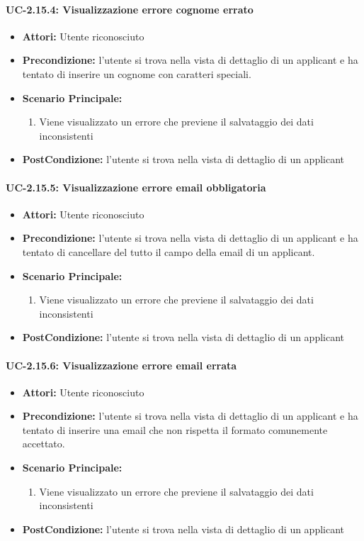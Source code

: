\paragraph{UC-2.15.4: Visualizzazione errore cognome errato}
\begin{itemize}	
	\item \textbf{Attori:} Utente riconosciuto
	\item \textbf{Precondizione:}  l'utente si trova nella vista di dettaglio di un applicant e ha tentato di inserire un cognome con caratteri speciali.
	\item \textbf{Scenario Principale:}
	\begin{enumerate}
		\item Viene visualizzato un errore che previene il salvataggio dei dati inconsistenti
	\end{enumerate}
	\item \textbf{PostCondizione:} l'utente si trova nella vista di dettaglio di un applicant
\end{itemize}

\paragraph{UC-2.15.5: Visualizzazione errore email obbligatoria}
\begin{itemize}	
	\item \textbf{Attori:} Utente riconosciuto
	\item \textbf{Precondizione:}  l'utente si trova nella vista di dettaglio di un applicant e ha tentato di cancellare del tutto il campo della email di un applicant.
	\item \textbf{Scenario Principale:}
	\begin{enumerate}
		\item Viene visualizzato un errore che previene il salvataggio dei dati inconsistenti
	\end{enumerate}
	\item \textbf{PostCondizione:} l'utente si trova nella vista di dettaglio di un applicant
\end{itemize}

\paragraph{UC-2.15.6: Visualizzazione errore email errata}
\begin{itemize}	
	\item \textbf{Attori:} Utente riconosciuto
	\item \textbf{Precondizione:}  l'utente si trova nella vista di dettaglio di un applicant e ha tentato di inserire una email che non rispetta il formato comunemente accettato.
	\item \textbf{Scenario Principale:}
	\begin{enumerate}
		\item Viene visualizzato un errore che previene il salvataggio dei dati inconsistenti
	\end{enumerate}
	\item \textbf{PostCondizione:} l'utente si trova nella vista di dettaglio di un applicant
\end{itemize}


